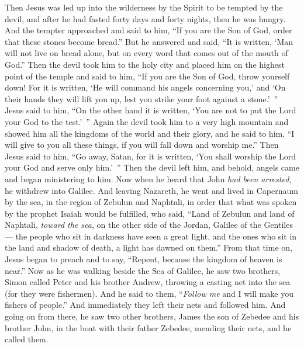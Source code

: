 \begin{biblechapter} %
 Then Jesus was led up into the wilderness by the Spirit to be tempted by the devil,
\verse and after he had fasted forty days and forty nights, then he was hungry.
\verse And the tempter approached and said to him, “If you are the Son of God, order that these stones become bread.”
\verse But he answered and said, “It is written, ‘Man will not live on bread alone, but on every word that comes out of the mouth of God.”
\verse Then the devil took him to the holy city and placed him on the highest point of the temple
\verse and said to him, “If you are the Son of God, throw yourself down! For it is written, ‘He will command his angels concerning you,’ and ‘On their hands they will lift you up, 
lest you strike your foot against a stone.’ ”
\verse Jesus said to him, “On the other hand it is written, ‘You are not to put the Lord your God to the test.’ ”
\verse Again the devil took him to a very high mountain and showed him all the kingdoms of the world and their glory,
\verse and he said to him, “I will give to you all these things, if you will fall down and worship me.”
\verse Then Jesus said to him, “Go away, Satan, for it is written, ‘You shall worship the Lord your God and serve only him.’ ”
\verse Then the devil left him, and behold, angels came and began ministering to him.
 Now when he heard that John \textit{had been arrested}, he withdrew into Galilee.
\verse And leaving Nazareth, he went and lived in Capernaum by the sea, in the region of Zebulun and Naphtali,
\verse in order that what was spoken by the prophet Isaiah would be fulfilled, who said,
\verse “Land of Zebulun and land of Naphtali, 
\textit{toward the sea}, on the other side of the Jordan, 
Galilee of the Gentiles—
\verse the people who sit in darkness 
have seen a great light, 
and the ones who sit in the land and shadow of death, 
a light has dawned on them.”
\verse From that time on, Jesus began to preach and to say, “Repent, because the kingdom of heaven is near.”
 Now as he was walking beside the Sea of Galilee, he saw two brothers, Simon called Peter and his brother Andrew, throwing a casting net into the sea (for they were fishermen).
\verse And he said to them, “\textit{Follow me} and I will make you fishers of people.”
\verse And immediately they left their nets and followed him.
\verse And going on from there, he saw two other brothers, James the son of Zebedee and his brother John, in the boat with their father Zebedee, mending their nets, and he called them.

\end{biblechapter}

